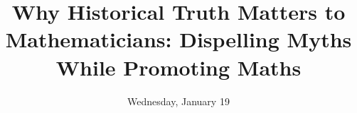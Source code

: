 \documentclass{colloqflyer}
\title{Why Historical Truth Matters to Mathematicians: Dispelling Myths While
Promoting Maths}
\date{Wednesday, January 19}
\begin{document}
\flyer{}
\end{document}
